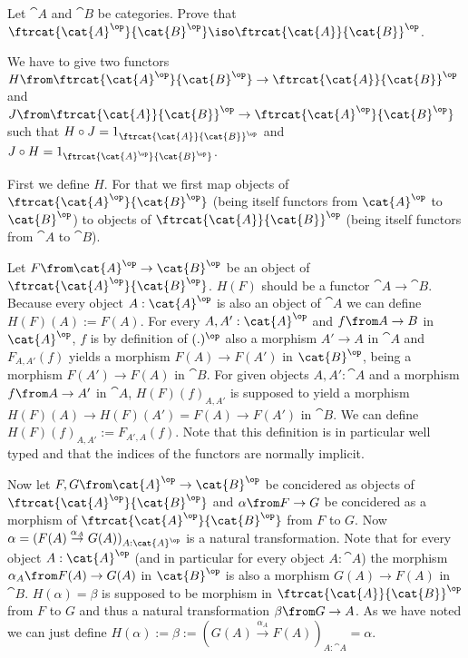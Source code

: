 \begin{exercise}
        Let $\cat{A}$ and $\cat{B}$ be categories. Prove that
        $\ftrcat{\cat{A}^\op}{\cat{B}^\op} \iso \ftrcat{\cat{A}}{\cat{B}}^\op$.
\end{exercise}

\begin{answer}
  We have to give two functors
  $H \from \ftrcat{\cat{A}^\op}{\cat{B}^\op} \to \ftrcat{\cat{A}}{\cat{B}}^\op$
  and
  $J \from \ftrcat{\cat{A}}{\cat{B}}^\op \to \ftrcat{\cat{A}^\op}{\cat{B}^\op}$
  such that $H \circ J = 1_{\ftrcat{\cat{A}}{\cat{B}}^\op}$ and $J \circ H = 1_{\ftrcat{\cat{A}^\op}{\cat{B}^\op}}$.

  First we define $H$. For that we first map objects of
  $\ftrcat{\cat{A}^\op}{\cat{B}^\op}$ (being itself functors from $\cat{A}^\op$ to $\cat{B}^\op$)
  to objects of $\ftrcat{\cat{A}}{\cat{B}}^\op$ (being itself functors from $\cat{A}$ to $\cat{B}$).

  Let $F\from \cat{A}^\op \to \cat{B}^\op$ be an object of $\ftrcat{\cat{A}^\op}{\cat{B}^\op}$.
  $H(F)$ should be a functor $\cat{A} \to \cat{B}$.
  Because every object $A : \cat{A}^\op$ is also an object of $\cat{A}$ we can define
  $H(F)(A) := F(A)$.
  For every $A, A' : \cat{A}^\op$ and $f \from A \to B$ in $\cat{A}^\op$,
  $f$ is by definition of $(.)^\op$ also a morphism $A' \to A$ in $\cat{A}$ and
  $F_{A,A'}(f)$ yields a morphism $F(A) \to F(A')$ in $\cat{B}^\op$, being a morphism $F(A') \to F(A)$ in $\cat{B}$.
  For given objects $A, A' : \cat{A}$ and a morphism $f \from A \to A'$ in $\cat{A}$, $H(F)(f)_{A,A'}$ is
  supposed to yield a morphism $H(F)(A) \to H(F)(A') = F(A) \to F(A')$ in $\cat{B}$.
  We can define $H(F)(f)_{A,A'} := F_{A',A}(f)$.
  Note that this definition is in particular well typed and that the indices of the functors are normally implicit.

  Now let $F, G \from \cat{A}^\op \to \cat{B}^\op$ be concidered as objects of $\ftrcat{\cat{A}^\op}{\cat{B}^\op}$ and
  $\alpha \from F \to G$ be concidered as a morphism of $\ftrcat{\cat{A}^\op}{\cat{B}^\op}$ from $F$ to $G$.
  Now $\alpha = (F(A) \stackrel{\alpha_A}{\to} G(A))_{A : \cat{A}^\op}$ is a natural transformation.
  Note that for every object $A : \cat{A}^\op$ (and in particular for every object $A : \cat{A}$)
  the morphism $\alpha_{A} \from F(A) \to G(A)$ in $\cat{B}^\op$ is also a morphism $G(A) \to F(A)$ in $\cat{B}$.
  $H(\alpha) = \beta$ is supposed to be morphism in ${\ftrcat{\cat{A}}{\cat{B}}}^\op$ from $F$ to $G$ and thus a natural transformation $\beta \from G \to A$.
  As we have noted we can just define $H(\alpha) := \beta := (G(A) \stackrel{\alpha_A}{\to} F(A))_{A : \cat{A}} = \alpha$.


\end{answer}

